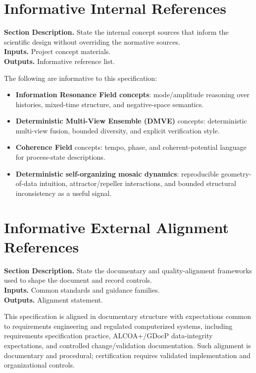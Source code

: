 \documentclass[11pt]{report}
\newcommand{\meta}[3]{\textbf{Section Description.} #1\\
\textbf{Inputs.} #2\\
\textbf{Outputs.} #3\par}
\begin{document}
\section{Informative Internal References}
\meta{State the internal concept sources that inform the scientific design without overriding the normative sources.}{Project concept materials.}{Informative reference list.}

The following are informative to this specification:
\begin{itemize}
    \item \textbf{Information Resonance Field concepts}: mode/amplitude reasoning over histories, mixed-time structure, and negative-space semantics.
    \item \textbf{Deterministic Multi-View Ensemble (DMVE)} concepts: deterministic multi-view fusion, bounded diversity, and explicit verification style.
    \item \textbf{Coherence Field} concepts: tempo, phase, and coherent-potential language for process-state descriptions.
    \item \textbf{Deterministic self-organizing mosaic dynamics}: reproducible geometry-of-data intuition, attractor/repeller interactions, and bounded structural inconsistency as a useful signal.
\end{itemize}

\section{Informative External Alignment References}
\meta{State the documentary and quality-alignment frameworks used to shape the document and record controls.}{Common standards and guidance families.}{Alignment statement.}

This specification is aligned in documentary structure with expectations common to requirements engineering and regulated computerized systems, including requirements specification practice, ALCOA+/GDocP data-integrity expectations, and controlled change/validation documentation. Such alignment is documentary and procedural; certification requires validated implementation and organizational controls.
\end{document}
